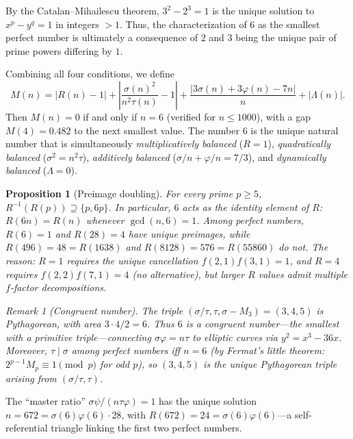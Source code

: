 \documentclass[11pt]{amsart}
\newtheorem{proposition}[theorem]{Proposition}
\theoremstyle{remark}
\newtheorem*{remark}{Remark}
\begin{document}
By the Catalan--Mihailescu theorem, $3^2 - 2^3 = 1$ is the unique
solution to $x^p - y^q = 1$ in integers $> 1$.
Thus, the characterization of $6$ as the smallest perfect number
is ultimately a consequence of $2$ and $3$ being the unique pair
of prime powers differing by $1$.

Combining all four conditions, we define
\[
  M(n) = |R(n)-1| + \left|\frac{\sigma(n)^2}{n^2\tau(n)}-1\right|
  + \frac{|3\sigma(n)+3\varphi(n)-7n|}{n} + |\Lambda(n)|.
\]
Then $M(n) = 0$ if and only if $n = 6$ (verified for $n \leq 1000$),
with a gap $M(4) = 0.482$ to the next smallest value.
The number $6$ is the unique natural number that is simultaneously
\emph{multiplicatively balanced} ($R = 1$),
\emph{quadratically balanced} ($\sigma^2 = n^2\tau$),
\emph{additively balanced} ($\sigma/n + \varphi/n = 7/3$), and
\emph{dynamically balanced} ($\Lambda = 0$).

\begin{proposition}[Preimage doubling]
For every prime $p \geq 5$, $R^{-1}(R(p)) \supseteq \{p, 6p\}$.
In particular, $6$ acts as the identity element of $R$:
$R(6n) = R(n)$ whenever $\gcd(n,6) = 1$.
Among perfect numbers, $R(6) = 1$ and $R(28) = 4$ have unique preimages,
while $R(496) = 48 = R(1638)$ and $R(8128) = 576 = R(55860)$ do not.
The reason: $R = 1$ requires the unique cancellation $f(2,1) f(3,1) = 1$,
and $R = 4$ requires $f(2,2) f(7,1) = 4$ (no alternative),
but larger $R$ values admit multiple $f$-factor decompositions.

\begin{remark}[Congruent number]
The triple $(\sigma/\tau, \tau, \sigma - M_3) = (3, 4, 5)$
is Pythagorean, with area $3 \cdot 4/2 = 6$.
Thus $6$ is a congruent number---the smallest with a primitive triple---connecting
$\sigma\varphi = n\tau$ to elliptic curves via $y^2 = x^3 - 36x$.
Moreover, $\tau \mid \sigma$ among perfect numbers iff $n = 6$
(by Fermat's little theorem: $2^{p-1} M_p \equiv 1 \pmod{p}$ for odd $p$),
so $(3,4,5)$ is the unique Pythagorean triple arising from $(\sigma/\tau, \tau)$.
\end{remark}
\end{proposition}

The ``master ratio'' $\sigma\psi/(n\tau\varphi) = 1$
has the unique solution $n = 672 = \sigma(6)\varphi(6) \cdot 28$,
with $R(672) = 24 = \sigma(6)\varphi(6)$---a self-referential triangle
linking the first two perfect numbers.
\end{document}
